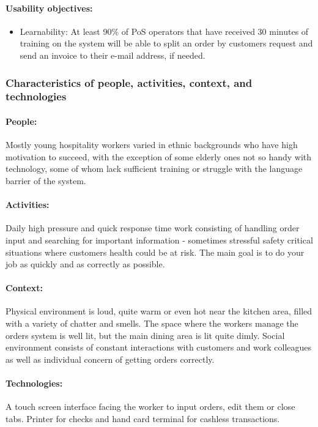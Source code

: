 \documentclass{article}
\begin{document}
\paragraph{Usability objectives:}
\begin{itemize}
    \item Learnability: At least  90\% of PoS operators that have received 30 minutes of training on the system will be able to split an order by customers request and send an invoice to their e-mail address, if needed. 
\end{itemize}



\subsubsection{Characteristics of people, activities, context, and technologies}
\paragraph{\small People:} Mostly young hospitality workers varied in ethnic backgrounds who have high motivation to succeed, with the exception of some elderly ones not so handy with technology, some of whom lack sufficient training or struggle with the language barrier of the system.
\paragraph{\small Activities:} Daily high pressure and quick response time work consisting of handling order input and searching for important information - sometimes stressful safety critical situations where customers health could be at risk. The main goal is to do your job as quickly and as correctly as possible.
\paragraph{\small Context:} Physical environment is loud, quite warm or even hot near the kitchen area, filled with a variety of chatter and smells. The space where the workers manage the orders system is well lit, but the main dining area is lit quite dimly. Social environment consists of constant interactions with customers and work colleagues as well as individual concern of getting orders correctly.
\paragraph{\small Technologies:} A touch screen interface facing the worker to input orders, edit them or close tabs. Printer for checks and hand card terminal for cashless transactions.
\end{document}
